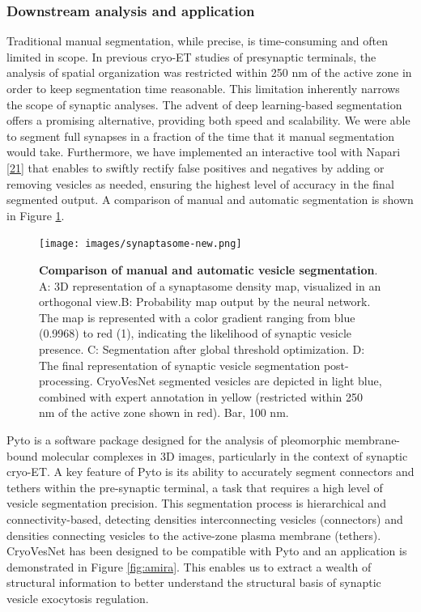 \hypertarget{downstream-analysis-and-application}{%
\subsubsection{Downstream analysis and application}\label{downstream-analysis-and-application}}

Traditional manual segmentation, while precise, is time-consuming and often limited in scope.
In previous cryo-ET studies of presynaptic terminals, the analysis of spatial organization was restricted within 250 nm of the active zone in order to keep segmentation time reasonable.
This limitation inherently narrows the scope of synaptic analyses.
The advent of deep learning-based segmentation offers a promising alternative, providing both speed and scalability.
We were able to segment full synapses in a fraction of the time that it manual segmentation would take.
Furthermore, we have implemented an interactive tool with Napari {[}\protect\hyperlink{ref-YEMgt2T4}{21}{]} that enables to swiftly rectify false positives and negatives by adding or removing vesicles as needed, ensuring the highest level of accuracy in the final segmented output.
A comparison of manual and automatic segmentation is shown in Figure \ref{fig:pipelineontomo}.

\begin{figure}
\hypertarget{fig:pipelineontomo}{%
\centering
\texttt{[image: images/synaptasome-new.png]}
\caption{\textbf{Comparison of manual and automatic vesicle segmentation}. A: 3D representation of a synaptasome density map, visualized in an orthogonal view.B: Probability map output by the neural network. The map is represented with a color gradient ranging from blue (0.9968) to red (1), indicating the likelihood of synaptic vesicle presence. C: Segmentation after global threshold optimization. D: The final representation of synaptic vesicle segmentation post-processing. CryoVesNet segmented vesicles are depicted in light blue, combined with expert annotation in yellow (restricted within 250 nm of the active zone shown in red). Bar, 100 nm.}\label{fig:pipelineontomo}
}
\end{figure}

Pyto is a software package designed for the analysis of pleomorphic membrane-bound molecular complexes in 3D images, particularly in the context of synaptic cryo-ET.
A key feature of Pyto is its ability to accurately segment connectors and tethers within the pre-synaptic terminal, a task that requires a high level of vesicle segmentation precision.
This segmentation process is hierarchical and connectivity-based, detecting densities interconnecting vesicles (connectors) and densities connecting vesicles to the active-zone plasma membrane (tethers).
CryoVesNet has been designed to be compatible with Pyto and an application is demonstrated in Figure \ref{fig:amira}.
This enables us to extract a wealth of structural information to better understand the structural basis of synaptic vesicle exocytosis regulation.

